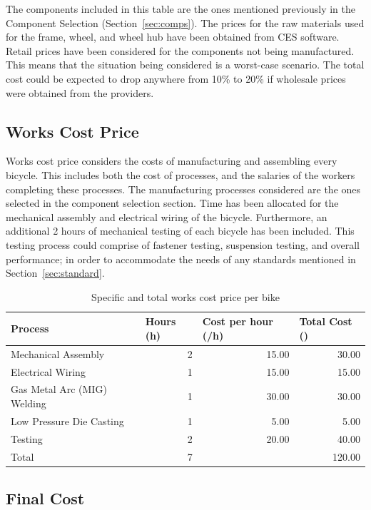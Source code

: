 \documentclass[a4paper,11pt]{article}
\begin{document}
The components included in this table are the ones mentioned previously in the Component Selection (Section~\ref{sec:comps}). The prices for the raw materials used for the frame, wheel, and wheel hub have been obtained from CES software. Retail prices have been considered for the components not being manufactured. This means that the situation being considered is a worst-case scenario. The total cost could be expected to drop anywhere from 10\% to 20\% if wholesale prices were obtained from the providers. 

\subsection{Works Cost Price}

Works cost price considers the costs of manufacturing and assembling every bicycle. This includes both the cost of processes, and the salaries of the workers completing these processes. The manufacturing processes considered are the ones selected in the component selection section. Time has been allocated for the mechanical assembly and electrical wiring of the bicycle. Furthermore, an additional 2 hours of mechanical testing of each bicycle has been included. This testing process could comprise of fastener testing, suspension testing, and overall performance; in order to accommodate the needs of any standards mentioned in Section~\ref{sec:standard}. 

\begin{table}[!ht]
	\centering
	\caption{Specific and total works cost price per bike}
	\begin{tabular}{l r r r}
		\hline
		\multicolumn{1}{l}{Process}&\multicolumn{1}{l}{Hours (h)}&\multicolumn{1}{l}{Cost per hour (\textsterling/h)}&\multicolumn{1}{l}{Total Cost (\textsterling)}\\\hline
		Mechanical Assembly&2&15.00&30.00\\
		Electrical Wiring&1&15.00&15.00\\
		Gas Metal Arc (MIG) Welding&1&30.00&30.00\\
		Low Pressure Die Casting&1&5.00&5.00\\
		Testing&2&20.00&40.00\\\hline
		Total&7&&120.00\\\hline
	\end{tabular}
\end{table}

\subsection{Final Cost}
\end{document}

